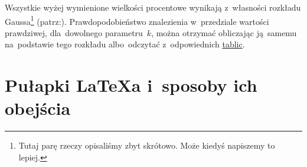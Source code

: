 \documentclass[a4paper,11pt]{article}
\begin{document}
\begin{enumerate}
  Wszystkie wyżej wymienione wielkości procentowe wynikają z~własności
  rozkładu Gaussa\footnote{Tutaj parę rzeczy opisaliśmy zbyt skrótowo.
    Może kiedyś napiszemy to lepiej.} (patrz:\label{sec:obliczenia}).
  Prawdopodobieństwo znalezienia w~przedziale wartości prawdziwej,
  dla~dowolnego parametru~$k$, można otrzymać obliczając ją~samemu
  na~podstawie tego rozkładu albo~odczytać z~odpowiednich
  \href{https://en.wikipedia.org/wiki/Standard_normal_table}{tablic}.
\end{enumerate}





\section{Pułapki \LaTeX a i~sposoby ich obejścia}
\label{sec:pulapki}
\end{document}
